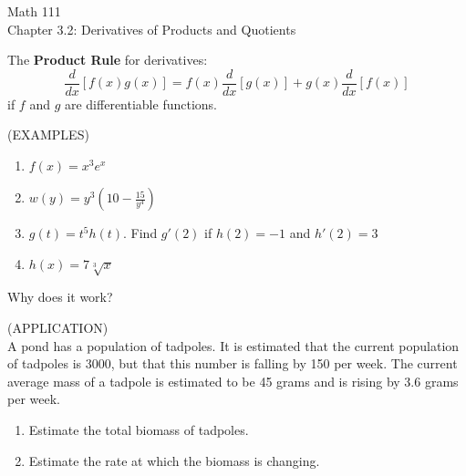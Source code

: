\documentclass[11pt]{article}
\begin{document}
\begin{center}
\Large
\rm{Math 111}
\\
\rm{Chapter 3.2:  Derivatives of Products and Quotients}
\\
\end{center}
\vspace{0.2in}

The {\bf Product Rule } for derivatives:
\begin{displaymath}
\frac{d}{dx}\left[f(x)g(x)  \right] = f(x)\frac{d}{dx}[g(x)] + g(x)\frac{d}{dx}[f(x)]
  \end{displaymath}
if $f$ and $g$ are differentiable functions.



\vspace{0.5in}


  (EXAMPLES)
\begin{enumerate}
\item{$f(x) = x^3e^x$}
  \vspace{0.3in}
\item{$w(y) = y^3\left(10-\frac{15}{y^4}\right)$}
    \vspace{0.3in}
  \item{$g(t) = t^5h(t)$.  Find $g'(2)$ if $h(2)=-1$ and $h'(2)=3$}
    \vspace{0.3in}
    \item{$h(x) = 7\sqrt[3]{x}$}
  \end{enumerate}

\vspace{0.3in}

Why does it work?  

\vspace{2.5in}

\pagebreak

(APPLICATION)\\
A pond has a population of tadpoles.  It is estimated that the current population of tadpoles is 3000, but that this
number is falling by 150 per week.  The current average mass of a tadpole is estimated to be 45 grams and is rising by
3.6 grams per week.
\begin{enumerate}
\item{Estimate the total biomass of tadpoles.}
  \vspace{0.2in}
  \item{Estimate the rate at which the biomass is changing.}
  \end{enumerate}

\vspace{1.5in}
\end{document}
